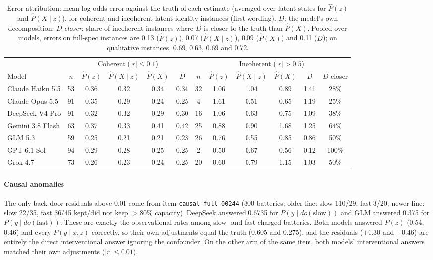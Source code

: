 \documentclass[11pt]{article}
\newcommand{\phat}{\hat{P}}
\begin{document}
\begin{table}[h]
\centering\footnotesize
\setlength{\tabcolsep}{4.5pt}
\begin{tabular}{@{}lccccccccccc@{}}
\toprule
 & \multicolumn{5}{c}{Coherent ($|r|\le0.1$)} & \multicolumn{6}{c}{Incoherent ($|r|>0.5$)} \\
\cmidrule(lr){2-6}\cmidrule(l){7-12}
Model & $n$ & $\phat(z)$ & $\phat(X\mid z)$ & $\phat(X)$ & $D$ & $n$ & $\phat(z)$ & $\phat(X\mid z)$ & $\phat(X)$ & $D$ & $D$ closer \\
\midrule
Claude Haiku 5.5 & 53 & 0.36 & 0.32 & 0.34 & 0.34 & 32 & 1.06 & 1.04 & 0.89 & 1.41 & 28\% \\
Claude Opus 5.5 & 91 & 0.35 & 0.29 & 0.24 & 0.25 & 4 & 1.61 & 0.51 & 0.65 & 1.19 & 25\% \\
DeepSeek V4-Pro & 91 & 0.32 & 0.32 & 0.29 & 0.30 & 16 & 1.06 & 0.63 & 0.75 & 1.09 & 38\% \\
Gemini 3.8 Flash & 63 & 0.37 & 0.33 & 0.41 & 0.42 & 25 & 0.88 & 0.90 & 1.68 & 1.25 & 64\% \\
GLM 5.3 & 59 & 0.25 & 0.21 & 0.21 & 0.23 & 26 & 0.76 & 0.55 & 0.85 & 0.86 & 50\% \\
GPT-6.1 Sol & 94 & 0.29 & 0.28 & 0.25 & 0.25 & 2 & 0.50 & 0.67 & 0.56 & 0.12 & 100\% \\
Grok 4.7 & 73 & 0.26 & 0.23 & 0.24 & 0.25 & 20 & 0.60 & 0.79 & 1.15 & 1.03 & 50\% \\
\bottomrule
\end{tabular}
\caption{Error attribution: mean log-odds error against the truth of each estimate (averaged over latent states for $\phat(z)$ and $\phat(X\mid z)$), for coherent and incoherent latent-identity instances (first wording). $D$: the model's own decomposition. \emph{$D$ closer}: share of incoherent instances where $D$ is closer to the truth than $\phat(X)$. Pooled over models, errors on full-spec instances are 0.13 ($\phat(z)$), 0.07 ($\phat(X\mid z)$), 0.09 ($\phat(X)$) and 0.11 ($D$); on qualitative instances, 0.69, 0.63, 0.69 and 0.72.}
\label{tab:attrib}
\end{table}

\paragraph{Causal anomalies} The only back-door residuals above 0.01 come from item \texttt{causal-full-00244} (300 batteries; older line: slow 110/29, fast 3/20; newer line: slow 22/35, fast 36/45 kept/did not keep $>$80\% capacity). DeepSeek answered 0.6735 for $P(y\mid do(\text{slow}))$ and GLM answered 0.375 for $P(y\mid do(\text{fast}))$. These are exactly the observational rates among slow- and fast-charged batteries. Both models answered $P(z)$ (0.54, 0.46) and every $P(y\mid x,z)$ correctly, so their own adjustments equal the truth (0.605 and 0.275), and the residuals ($+0.30$ and $+0.46$) are entirely the direct interventional answer ignoring the confounder. On the other arm of the same item, both models' interventional answers matched their own adjustments ($|r|\le0.01$).
\end{document}
